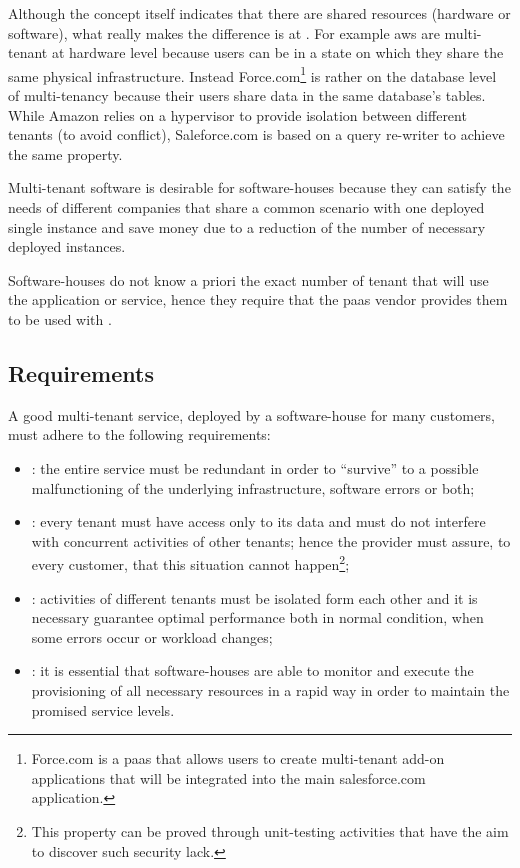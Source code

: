 Although the concept itself indicates that there are shared resources (hardware or software), what really
makes the difference is at . For example \ac{aws} are
multi-tenant at hardware level because users can be in a state on which they share the same physical
infrastructure. Instead Force.com\footnote{Force.com is a \ac{paas} that allows users to create
multi-tenant add-on applications that will be integrated into the main salesforce.com application.} is rather on
the database level of multi-tenancy because their users share data in the same database's tables. While
Amazon relies on a hypervisor to provide isolation between different tenants (to avoid conflict),
Saleforce.com is based on a query re-writer to achieve the same property.

Multi-tenant software is desirable for software-houses because they can satisfy the needs of different
companies that share a common scenario with one deployed single instance and save money due to a
reduction of the number of necessary deployed instances. 

Software-houses do not know a priori the exact number of tenant that will use the application or service,
hence they require that the \ac{paas} vendor provides them  to be used
with .

\subsection{Requirements}
\label{sec:elasticity-multiTenancy-requirements}
A good multi-tenant service, deployed by a software-house for many customers, must adhere to the following
requirements:

\begin{itemize}
	\item{: the entire service must be redundant in order to ``survive'' to a possible
		malfunctioning of the underlying infrastructure, software errors or both;}
	\item{: every tenant must have access only to its data and must do not interfere
		with concurrent activities of other tenants; hence the provider must assure, to every customer, that this
		situation cannot happen\footnote{This property can be proved through unit-testing activities that have the
		aim to discover such security lack.};}
	\item{: activities of different tenants must be isolated form each other and it
		is necessary guarantee optimal performance both in normal condition, when some errors occur or workload
		changes;}
	\item{: it is essential that software-houses are able to monitor and execute the
		provisioning of all necessary resources in a rapid way in order to maintain the promised service levels.}
\end{itemize}

